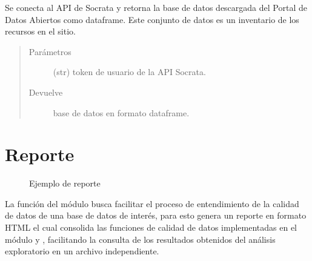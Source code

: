 \documentclass[letterpaper,10pt,openany,spanish]{sphinxmanual}
\begin{document}
\begin{fulllineitems}
\label{\detokenize{datos_gov:datos_gov.tabla_inventario}}
Se conecta al API de Socrata y retorna la base de datos  descargada del Portal de Datos Abiertos
como dataframe. Este conjunto de datos es un inventario de los recursos en el sitio.
\begin{quote}\begin{description}
\item[{Parámetros}] \leavevmode
{} \textendash{} (str)  \sphinxhyphen{} token de usuario de la API Socrata.

\item[{Devuelve}] \leavevmode
base de datos en formato dataframe.

\end{description}\end{quote}

\end{fulllineitems}



\chapter{Reporte}
\label{\detokenize{reporte:reporte}}\label{\detokenize{reporte:id1}}\label{\detokenize{reporte::doc}}
\begin{figure}[htbp]
\centering
\capstart

\noindent{}
\caption{Ejemplo de reporte}\label{\detokenize{reporte:id2}}\end{figure}

La función  del módulo  busca facilitar el proceso de entendimiento de la calidad de datos de una base de datos de interés, para esto genera un reporte en formato HTML el cual consolida las funciones de calidad de datos implementadas en el módulo {\hyperref[\detokenize{calidad_datos:calidad-datos}]{}} y {\hyperref[\detokenize{datos_gov:datos-gov}]{}}, facilitando la consulta de los resultados obtenidos del análisis exploratorio en un archivo independiente.
\end{document}
